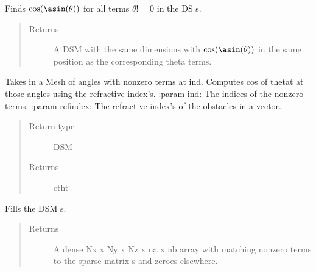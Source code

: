 \documentclass[letterpaper,10pt,english]{sphinxmanual}
\begin{document}
\begin{fulllineitems}
\begin{fulllineitems}
\begin{quote}
\begin{description}
\end{description}\end{quote}

\end{fulllineitems}


\begin{fulllineitems}
\label{index:DictionarySparseMatrix.DS.cos_asin}
Finds \(\cos( \asin( \theta))\) for all terms     \(\theta != 0\) in the DS s.
\begin{quote}\begin{description}
\item[{Returns}] \leavevmode
A DSM with the same dimensions with     \(\cos( \asin( \theta))\) in the      same position as the corresponding theta terms.

\end{description}\end{quote}

\end{fulllineitems}


\begin{fulllineitems}
\label{index:DictionarySparseMatrix.DS.costhetat}
Takes in a Mesh of angles with nonzero terms at ind. Computes
cos of thetat at those angles using the refractive index's.
:param ind: The indices of the nonzero terms.
:param refindex: The refractive index's of the obstacles in a vector.
\begin{quote}\begin{description}
\item[{Return type}] \leavevmode
DSM

\item[{Returns}] \leavevmode
ctht

\end{description}\end{quote}

\end{fulllineitems}


\begin{fulllineitems}
\label{index:DictionarySparseMatrix.DS.dense}
Fills the DSM s.
\begin{quote}\begin{description}
\item[{Returns}] \leavevmode
A dense Nx x Ny x Nz x na x nb array with matching nonzero terms to      the sparse matrix s and zeroes elsewhere.


\end{description}
\end{quote}
\end{fulllineitems}
\end{fulllineitems}
\end{document}

